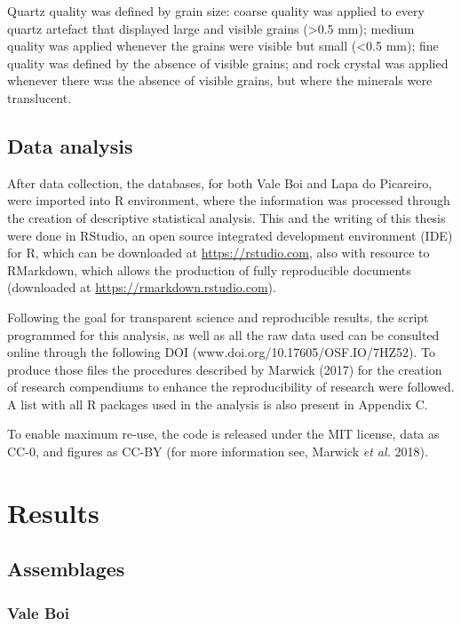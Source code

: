 \documentclass[12pt,twoside]{reedthesis}
\begin{document}
Quartz quality was defined by grain size: coarse quality was applied to every quartz artefact that displayed large and visible grains (\textgreater0.5 mm); medium quality was applied whenever the grains were visible but small (\textless0.5 mm); fine quality was defined by the absence of visible grains; and rock crystal was applied whenever there was the absence of visible grains, but where the minerals were translucent.

\hypertarget{data-analysis}{%
\section{Data analysis}\label{data-analysis}}

After data collection, the databases, for both Vale Boi and Lapa do Picareiro, were imported into R environment, where the information was processed through the creation of descriptive statistical analysis. This and the writing of this thesis were done in RStudio, an open source integrated development environment (IDE) for R, which can be downloaded at \url{https://rstudio.com}, also with resource to RMarkdown, which allows the production of fully reproducible documents (downloaded at \url{https://rmarkdown.rstudio.com}).

Following the goal for transparent science and reproducible results, the script programmed for this analysis, as well as all the raw data used can be consulted online through the following DOI (www.doi.org/10.17605/OSF.IO/7HZ52). To produce those files the procedures described by Marwick (2017) for the creation of research compendiums to enhance the reproducibility of research were followed. A list with all R packages used in the analysis is also present in Appendix C.

To enable maximum re-use, the code is released under the MIT license, data as CC-0, and figures as CC-BY (for more information see, Marwick \emph{et al.} 2018).

\hypertarget{results}{%
\chapter{Results}\label{results}}

\hypertarget{assemblages}{%
\section{Assemblages}\label{assemblages}}

\hypertarget{vale-boi-2}{%
\subsection{Vale Boi}\label{vale-boi-2}}
\end{document}
